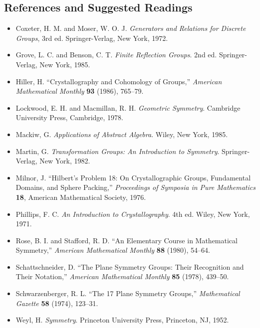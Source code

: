  
 
\subsection*{References and Suggested Readings}
 
 
 
{\small
\begin{itemize} %
 
\item[{\bf [1]}]
Coxeter, H. M. and Moser, W. O. J. {\it Generators and
Relations for Discrete Groups}, 3rd ed. Springer-Verlag, New
York, 1972.
 
\item[{\bf [2]}]
Grove, L. C. and Benson, C. T. {\it Finite Reflection
Groups}. 2nd ed. Springer-Verlag, New York, 1985.
 
\item[{\bf [3]}]
Hiller, H. ``Crystallography and Cohomology of Groups,''
{\it American Mathematical Monthly} {\bf 93} (1986), 765--79.
 
\item[{\bf [4]}]
Lockwood, E. H. and Macmillan, R. H. {\it Geometric
Symmetry}. Cambridge University Press, Cambridge, 1978.
 
\item[{\bf [5]}]
Mackiw, G. {\it Applications of Abstract Algebra}. Wiley,
New York, 1985.
 
 
\item[{\bf [6]}]
Martin,  G.  {\it Transformation  Groups:  An Introduction to
Symmetry}.  Springer-Verlag, New York, 1982.
 
  
\item[{\bf [7]}]
Milnor, J. ``Hilbert's Problem 18: On Crystallographic
Groups, Fundamental Domains, and Sphere Packing,'' {\it
Proceedings of Symposia in Pure Mathematics} {\bf 18},
American Mathematical Society, 1976.
 
\item[{\bf [8]}]
Phillips, F. C. {\it An Introduction to Crystallography}.
4th ed. Wiley, New York, 1971.
 
\item[{\bf [9]}]
Rose, B. I. and Stafford, R. D. ``An Elementary Course in
Mathematical Symmetry,'' {\it American Mathematical Monthly} {\bf
88} (1980), 54--64.
 
 
\item[{\bf [10]}]
Schattschneider, D. ``The Plane Symmetry Groups: Their
Recognition and Their Notation,'' {\it American Mathematical 
Monthly} {\bf 85} (1978), 439--50.
 
 
\item[{\bf [11]}]
Schwarzenberger, R. L. ``The 17 Plane Symmetry Groups,'' {\it
Mathematical  Gazette} {\bf 58} (1974), 123--31. 
 
 
\item[{\bf [12]}]
Weyl, H. {\it Symmetry}. Princeton University Press, Princeton, NJ,
1952. 
 
 
\end{itemize}
}
 
 
 
 
